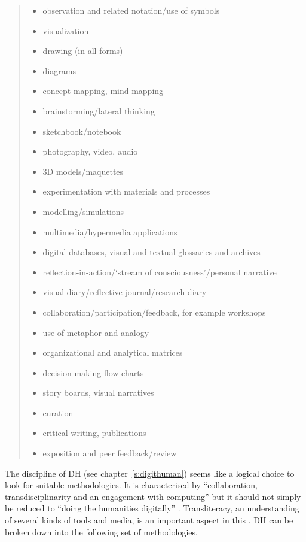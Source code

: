 \begin{quotation}
\begin{itemize}
  \item observation and related notation/use of symbols
  \item visualization
  \item drawing (in all forms)
  \item diagrams
  \item concept mapping, mind mapping
  \item brainstorming/lateral thinking
  \item sketchbook/notebook
  \item photography, video, audio
  \item 3D models/maquettes
  \item experimentation with materials and processes
  \item modelling/simulations
  \item multimedia/hypermedia applications
  \item digital databases, visual and textual glossaries and archives
  \item reflection-in-action/`stream of consciousness'/personal narrative
  \item visual diary/reflective journal/research diary
  \item collaboration/participation/feedback, for example workshops
  \item use of metaphor and analogy
  \item organizational and analytical matrices
  \item decision-making flow charts
  \item story boards, visual narratives
  \item curation
  \item critical writing, publications
  \item exposition and peer feedback/review
\end{itemize}
\end{quotation}

The discipline of \acf{DH} (see chapter~\ref{s:digithuman}) seems like a logical choice to look for suitable methodologies. It is characterised by ``collaboration, transdisciplinarity and an engagement with computing'' \autocite{Burdick2012} but it should not simply be reduced to ``doing the humanities digitally'' \autocite*{Burdick2012}. Transliteracy, an understanding of several kinds of tools and media, is an important aspect in this \autocite{Thomas2007}. \ac{DH} can be broken down into the following set of methodologies.

